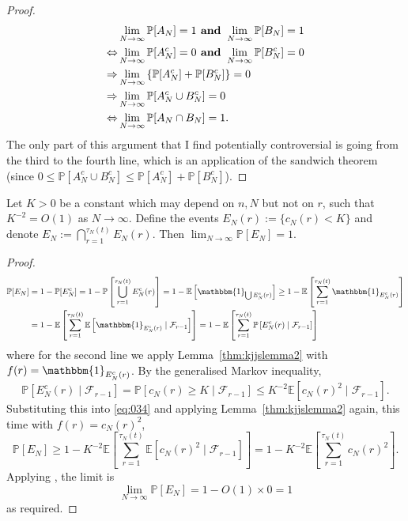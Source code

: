 \documentclass{article}
\newcommand{\Prob}{\mathbb{P}}
\newcommand{\E}{\mathbb{E}}
\newcommand{\1}[1]{\mathbbm{1}_{#1}}
\begin{document}
\begin{proof}
\begin{align}
&\lim_{N\to\infty} \Prob[A_N] =1 \textbf{ and } 
        \lim_{N\to\infty} \Prob[B_N] =1 \notag\\
\Leftrightarrow &\lim_{N\to\infty} \Prob[A_N^c] =0 \textbf{ and } 
        \lim_{N\to\infty} \Prob[B_N^c] =0 \notag\\
\Rightarrow &\lim_{N\to\infty} \left\{ \Prob[A_N^c] 
        + \Prob[B_N^c] \right\} =0 \notag\\
\Rightarrow &\lim_{N\to\infty} \Prob[A_N^c \cup B_N^c] =0 \notag\\
\Leftrightarrow &\lim_{N\to\infty} \Prob[ A_N \cap B_N ] =1.
\end{align}
The only part of this argument that I find potentially controversial is going from the third to the fourth line, which is an application of the sandwich theorem (since $0 \leq \Prob[A_N^c \cup B_N^c] \leq \Prob[A_N^c] + \Prob[B_N^c]$).
\end{proof}


\begin{lemma}\label{thm:indicators_cN}
Let $K>0$ be a constant which may depend on $n, N$ but not on $r$, such that $K^{-2} = O(1)$ as $N\to\infty$.
Define the events $E_N(r) := \{ c_N(r) < K \}$ and denote $E_N := \bigcap_{r=1}^{\tau_N(t)} E_N(r)$.
Then $\lim_{N\to\infty} \Prob[E_N]=1$.
\end{lemma}

\begin{proof}
\begin{align}
\Prob[E_N]
&= 1- \Prob[E_N^c]
= 1- \Prob\left[ \bigcup_{r=1}^{\tau_N(t)} E_N^c(r) \right]
= 1- \E\left[ \1{\bigcup E_N^c(r)} \right]
\geq 1 - \E\left[ \sum_{r=1}^{\tau_N(t)} \1{E_N^c(r)} \right] \notag\\
&= 1- \E\left[  \sum_{r=1}^{\tau_N(t)} \E\left[ \1{E_N^c(r)} 
        \mid \mathcal{F}_{r-1} \right] \right]
= 1- \E\left[  \sum_{r=1}^{\tau_N(t)} \Prob\left[ E_N^c(r)
        \mid \mathcal{F}_{r-1} \right] \right] \label{eq:034}
\end{align}
where for the second line we apply Lemma~\ref{thm:kjjslemma2} with $f(r) = \1{E_N^c(r)} $.
By the generalised Markov inequality,
\begin{equation}
\Prob[ E_N^c(r) \mid \mathcal{F}_{r-1} ]
= \Prob[ c_N(r) \geq K \mid \mathcal{F}_{r-1} ]
\leq K^{-2} \E[c_N(r)^2 \mid \mathcal{F}_{r-1} ] .
\end{equation}
Substituting this into \eqref{eq:034} and applying Lemma~\ref{thm:kjjslemma2} again, this time with $f(r) = c_N(r)^2$,
\begin{equation}
\Prob[E_N]
\geq 1- K^{-2} \E\left[  \sum_{r=1}^{\tau_N(t)} 
        \E[c_N(r)^2 \mid \mathcal{F}_{r-1} ] \right]
= 1 - K^{-2} \E\left[  \sum_{r=1}^{\tau_N(t)} c_N(r)^2 \right] .
\end{equation}
Applying \citet[Equation (3.5)]{brown2021}, the limit is
\begin{equation}
\lim_{N\to\infty} \Prob[E_N]
= 1 - O(1) \times 0
=1 
\end{equation}
as required.
\end{proof}
\end{document}
